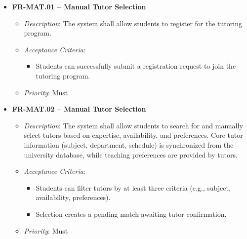     \begin{itemize}
        \item \textbf{FR-MAT.01 – Manual Tutor Selection}
            \begin{itemize}
                \item \textit{Description}: The system shall allow students to register for the tutoring program.
                \item \textit{Acceptance Criteria}:
                    \begin{itemize}
                        \item Students can successfully submit a registration request to join the tutoring program.
                    \end{itemize}
                \item \textit{Priority}: Must
            \end{itemize}

        \item \textbf{FR-MAT.02 – Manual Tutor Selection}
            \begin{itemize}
                \item \textit{Description}: The system shall allow students to search for and manually select tutors based on expertise, availability, and preferences. Core tutor information (subject, department, schedule) is synchronized from the university database, while teaching preferences are provided by tutors.
                \item \textit{Acceptance Criteria}:
                    \begin{itemize}
                        \item Students can filter tutors by at least three criteria (e.g., subject, availability, preferences).
                        \item Selection creates a pending match awaiting tutor confirmation.
                    \end{itemize}
                \item \textit{Priority}: Must
            \end{itemize}
    

\end{itemize}
